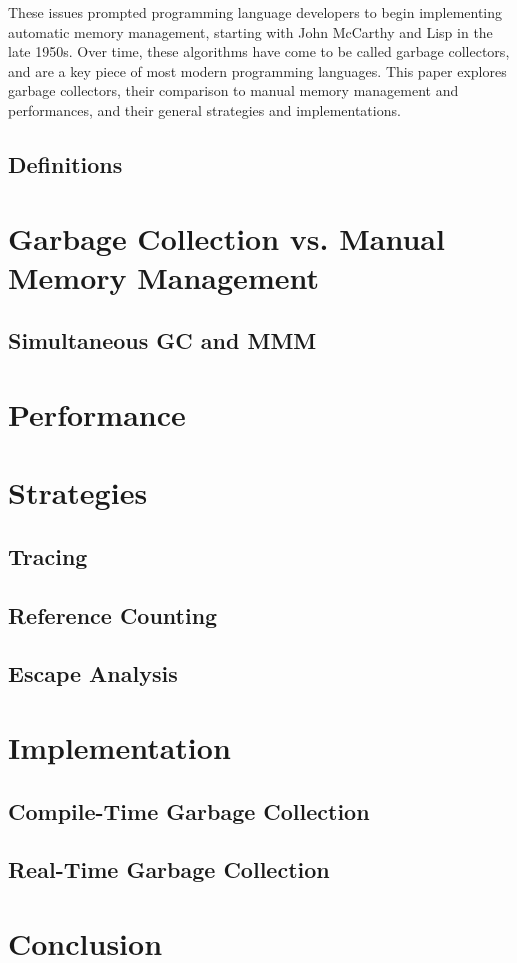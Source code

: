 \documentclass[12pt]{article}
\begin{document}
These issues prompted programming language developers to begin implementing automatic memory management, starting with John McCarthy and Lisp in the late 1950s.\cite{https://www.seas.harvard.edu/courses/cs252/2016fa/16.pdf} Over time, these algorithms have come to be called garbage collectors, and are a key piece of most modern programming languages. This paper explores garbage collectors, their comparison to manual memory management and performances, and their general strategies and implementations. 

\subsection{Definitions}
\section{Garbage Collection vs. Manual Memory Management}
\subsection{Simultaneous GC and MMM}
\section{Performance}
\section{Strategies}
\subsection{Tracing}
\subsection{Reference Counting}
\subsection{Escape Analysis}
\section{Implementation}
\subsection{Compile-Time Garbage Collection}
\subsection{Real-Time Garbage Collection}
\section{Conclusion}
\end{document}

